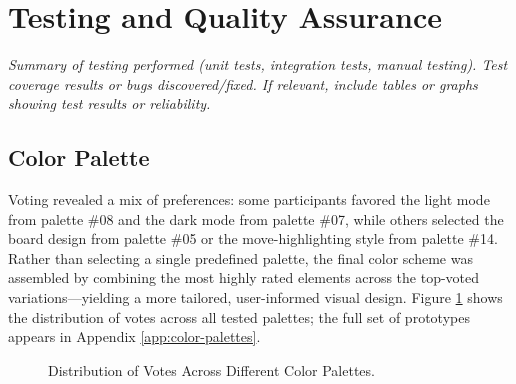 \section{Testing and Quality Assurance}
\textit{Summary of testing performed (unit tests, integration tests, manual testing). Test coverage results or bugs discovered/fixed. If relevant, include tables or graphs showing test results or reliability.}

\subsection{Color Palette}

Voting revealed a mix of preferences: some participants favored the light mode from palette \#08 and the dark mode from palette \#07, while others selected the board design from palette \#05 or the move-highlighting style from palette \#14. \\

Rather than selecting a single predefined palette, the final color scheme was assembled by combining the most highly rated elements across the top-voted variations—yielding a more tailored, user-informed visual design. Figure \ref{fig:color-palette-results} shows the distribution of votes across all tested palettes; the full set of prototypes appears in Appendix \ref{app:color-palettes}.

\begin{figure}[htbp]
\centering
{}
\caption{Distribution of Votes Across Different Color Palettes.}
\label{fig:color-palette-results}
\end{figure}